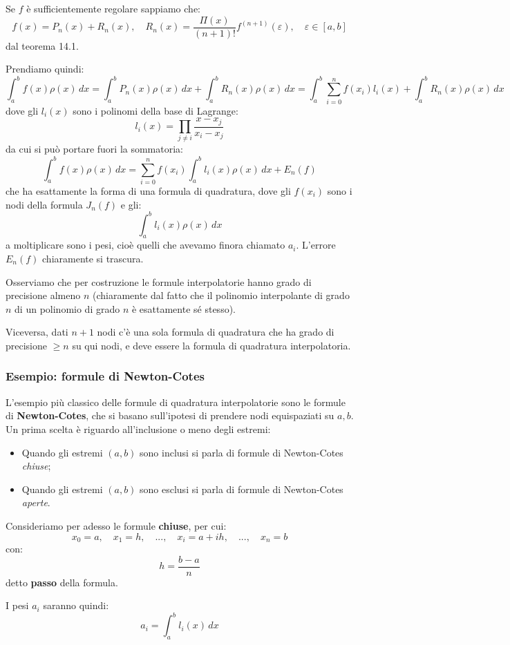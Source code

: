 \documentclass[a4paper,11pt]{article}
\begin{document}
Se $f$ è sufficientemente regolare sappiamo che:
$$
f(x) = P_n(x) + R_n(x), \quad R_n(x) = \frac{\Pi (x)}{(n + 1)!} f^{(n + 1)} (\varepsilon), \quad \varepsilon \in [a, b]
$$
dal teorema 14.1.

Prendiamo quindi:
$$
\int_a^b f(x) \rho(x) \, dx = \int_a^b P_n(x) \rho(x) \, dx + \int_a^b R_n(x) \rho(x) \, dx = \int_a^b \sum_{i = 0}^n f(x_i) l_i(x) + \int_a^b R_n(x) \rho(x) \, dx
$$
dove gli $l_i(x)$ sono i polinomi della base di Lagrange:
$$
l_i(x) = \prod_{j \neq i} \frac{x - x_j}{x_i - x_j}
$$
da cui si può portare fuori la sommatoria:
$$
\int_a^b f(x) \rho(x) \, dx = \sum_{i = 0}^n f(x_i) \int_a^b l_i(x) \rho(x) \, dx + E_n(f)
$$
che ha esattamente la forma di una formula di quadratura, dove gli $f(x_i)$ sono i nodi della formula $J_n(f)$ e gli:
$$
\int_a^b l_i(x) \rho(x) \, dx
$$
a moltiplicare sono i pesi, cioè quelli che avevamo finora chiamato $a_i$.
L'errore $E_n(f)$ chiaramente si trascura.

Osserviamo che per costruzione le formule interpolatorie hanno grado di precisione almeno $n$ (chiaramente dal fatto che il polinomio interpolante di grado $n$ di un polinomio di grado $n$ è esattamente sé stesso).

Viceversa, dati $n + 1$ nodi c'è una sola formula di quadratura che ha grado di precisione $\geq n$ su qui nodi, e deve essere la formula di quadratura interpolatoria.

\subsubsection{Esempio: formule di Newton-Cotes}
L'esempio più classico delle formule di quadratura interpolatorie sono le formule di \textbf{Newton-Cotes}, che si basano sull'ipotesi di prendere nodi equispaziati su $a, b$.
Un prima scelta è riguardo all'inclusione o meno degli estremi:
\begin{itemize}
	\item Quando gli estremi $(a, b)$ sono inclusi si parla di formule di Newton-Cotes \textit{chiuse};
	\item Quando gli estremi $(a, b)$ sono esclusi si parla di formule di Newton-Cotes \textit{aperte}.
\end{itemize}

Consideriamo per adesso le formule \textbf{chiuse}, per cui:
$$
x_0 = a, \quad x_1 = h, \quad ..., \quad x_i = a + ih, \quad ..., \quad x_n = b
$$
con:
$$
h = \frac{b - a}{n}
$$
detto \textbf{passo} della formula.

I pesi $a_i$ saranno quindi:
$$
a_i = \int_a^b l_i(x) \, dx
$$
\end{document}
